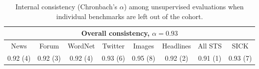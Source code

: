 \vspace{-7mm}
\begin{table*}[h]
\renewcommand{\tabcolsep}{4.6pt}
\small
\begin{center}
      {
        \begin{tabular}{cccccccc}
           \multicolumn{8}{c}{Overall consistency, \(\alpha = 0.93\)} \\
          \hline
                     News & Forum & WordNet & Twitter & Images & Headlines & All STS  & SICK \\
                                          \footnotesize 0.92	(4) &0.92 (3)	 &0.92 (4) &	0.93 (6)  &	0.95 (8)	 &0.92 (2)  &	0.91 (1)  &0.93 (7) \\
                                          \hline
        \end{tabular}
    }
    \caption{Internal consistency (Chronbach's \(\alpha\)) among unsupervised evaluations when individual benchmarks are left out of the cohort.}
  \end{center}
\end{table*}








